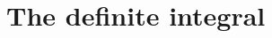 \documentclass[../book/calcnotes.tex]{subfiles}
\begin{document}
\chapter{The definite integral}



\end{document}
